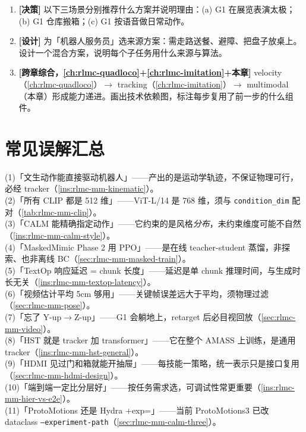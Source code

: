 \begin{practice}[练习·选型]
\begin{enumerate}
  \item \textbf{[决策]} 以下三场景分别推荐什么方案并说明理由：(a) G1 在展览表演太极；(b) G1 仓库搬箱；(c) G1 按语音做日常动作。
  \item \textbf{[设计]} 为「机器人服务员」选来源方案：需走路送餐、避障、把盘子放桌上。设计一个混合方案，说明每个子任务用什么来源与算法。
  \item \textbf{[跨章综合，\cref{ch:rlmc-quadloco}+\cref{ch:rlmc-imitation}+本章]} velocity（\cref{ch:rlmc-quadloco}）$\to$ tracking（\cref{ch:rlmc-imitation}）$\to$ multimodal（本章）形成能力递进。画出技术依赖图，标注每步复用了前一步的什么组件。
\end{enumerate}
\end{practice}

\section*{常见误解汇总}
\label{sec:rlmc-mm-misconceptions}

\begin{pitfall}[本章常见误解一览]
(1)「文生动作能直接驱动机器人」——产出的是运动学轨迹，不保证物理可行，必经 tracker（\cref{ins:rlmc-mm-kinematic}）。\\
(2)「所有 CLIP 都是 512 维」——ViT-L/14 是 768 维，须与 \verb|condition_dim| 配对（\cref{tab:rlmc-mm-clip}）。\\
(3)「CALM 能精确指定动作」——它约束的是风格\emph{分布}，未约束维度可能不自然（\cref{ins:rlmc-mm-calm-style}）。\\
(4)「MaskedMimic Phase 2 用 PPO」——是在线 teacher-student 蒸馏，非探索、也非离线 BC（\cref{sec:rlmc-mm-masked-train}）。\\
(5)「TextOp 响应延迟 = chunk 长度」——延迟是单 chunk 推理时间，与生成时长无关（\cref{ins:rlmc-mm-textop-latency}）。\\
(6)「视频估计平均 5cm 够用」——关键帧误差远大于平均，须物理过滤（\cref{sec:rlmc-mm-pose}）。\\
(7)「忘了 Y-up$\to$Z-up」——G1 会躺地上，retarget 后必目视回放（\cref{sec:rlmc-mm-video}）。\\
(8)「HST 就是 tracker 加 transformer」——它在整个 AMASS 上训练，是通用 tracker（\cref{ins:rlmc-mm-hst-general}）。\\
(9)「HDMI 见过门和箱就能开抽屉」——每技能一策略，统一表示只是接口复用（\cref{sec:rlmc-mm-hdmi-design}）。\\
(10)「端到端一定比分层好」——按任务需求选，可调试性常更重要（\cref{ins:rlmc-mm-hier-vs-e2e}）。\\
(11)「ProtoMotions 还是 Hydra +exp=」——当前 ProtoMotions3 已改 dataclass \texttt{--experiment-path}（\cref{sec:rlmc-mm-calm-three}）。
\end{pitfall}

